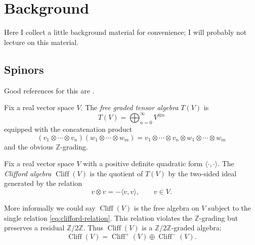 \documentclass[12pt,letterpaper,reqno]{article}
\numberwithin{equation}{section}
\newcommand{\Z}{\ensuremath{\mathbb Z}}
\newcommand{\IP}[1]{\langle#1\rangle}
\newcommand{\ti}[1]{\textit{#1}}
\DeclareMathOperator{\Cliff}{Cliff}
\newcommand{\fixme}[1]{{\color{orange}{[#1]}}}
\begin{document}
\fixme{interpretation as a kind of integral you do with an equiariantly closed form;
you can also do this for more general
equivariantly closed forms: Atiyah-Bott-Berline-Vergne}

\fixme{exercise: do it with higher-dimensional fixed sets, then the integrand
will be equivariant Euler class}


\appendix

\section{Background}

Here I collect a little background material for convenience; I will probably
not lecture on this material.

\subsection{Spinors}

Good references for this are \cite{MR1031992,MR1367507}.

\begin{defn} Fix a real vector space $V$. The
\ti{free graded tensor algebra} $T(V)$ is
\begin{equation}
  T(V) = \bigoplus_{n=0}^\infty V^{\otimes n}
\end{equation}
equipped with the concatenation product
\begin{equation}
  (v_1 \otimes \cdots \otimes v_n) (w_1 \otimes \cdots \otimes w_m) = v_1 \otimes \cdots \otimes v_n \otimes w_1 \otimes \cdots \otimes w_m
\end{equation}
and the obvious $\Z$-grading.
\end{defn}

\begin{defn} Fix a real vector space $V$ with a positive definite
quadratic form $\IP{\cdot,\cdot}$. The \ti{Clifford algebra} $\Cliff(V)$ is the quotient
of $T(V)$ by the two-sided ideal generated by the relation
\begin{equation} \label{eq:clifford-relation}
  v \otimes v = -\IP{v,v}, \qquad v \in V.
\end{equation}
\end{defn}
More informally we could say $\Cliff(V)$ is the free algebra on $V$
subject to the single relation \eqref{eq:clifford-relation}.
This relation violates the $\Z$-grading but preserves a residual $\Z/2\Z$.
Thus $\Cliff(V)$ is a $\Z/2\Z$-graded algebra:
\begin{equation}
  \Cliff(V) = \Cliff^+(V) \oplus \Cliff^-(V).
\end{equation}
\end{document}
